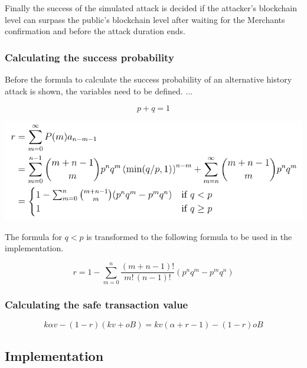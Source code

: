 Finally the success of the simulated attack is decided if the attacker's blockchain level can surpass the public's blockchain level after waiting for the Merchants confirmation and before the attack duration ends.

\subsubsection{Calculating the success probability  \cite{doublespending}}

Before the formula to calculate the success probability of an alternative history attack is shown, the variables need to be defined.\linebreak
...

\begin{equation}
p + q = 1
\end{equation}

\includegraphics[scale=0.7]{successProbability.PNG} 

The formula for $q < p$ is transformed to the following formula to be used in the implementation.

\begin{equation}
r = 1-\sum\limits_{m=0}^n \frac{(m+n-1)!}{m!\,(n-1)!}(p^nq^m-p^mq^n)
\end{equation}

\subsubsection{Calculating the safe transaction value  \cite{doublespending}}

\begin{equation}
k \alpha v - (1 - r)(kv + oB) = kv( \alpha + r - 1) - (1 - r)oB
\end{equation}

\subsection{Implementation}



